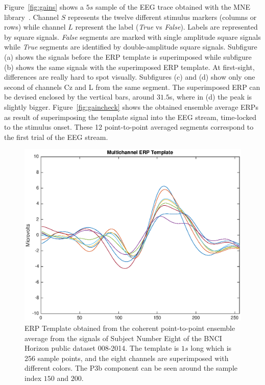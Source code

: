 \documentclass[brainsci,article,submit,moreauthors,pdftex,10pt,a4paper]{mdpi}
\begin{document}
Figure~\ref{fig:gains} shows a $5s$ sample of the EEG trace obtained with the MNE library~\citep{Gramfort2013}.  Channel $S$ represents the twelve different stimulus markers (columns or rows) while channel $L$ represent the label (\textit{True} vs \textit{False}).  Labels are represented by square signals.  \textit{False} segments are marked with single amplitude square signals while \textit{True} segments are identified by double-amplitude square signals.  Subfigure (a) shows the signals before the ERP template is superimposed while subfigure (b) shows the same signals with the superimposed ERP template.  At first-sight, differences are really hard to spot visually.  Subfigures (c) and (d) show only one second of channels Cz and L from the same segment.  The superimposed ERP can be devised enclosed by the vertical bars, around $31.5$s, where in (d) the peak is slightly bigger.  Figure~\ref{fig:gaincheck} shows the obtained ensemble average ERPs as result of superimposing the template signal into the EEG stream, time-locked to the stimulus onset.   These 12 point-to-point averaged segments correspond to the first trial of the EEG stream.


\begin{figure}[H]
\centering
\includegraphics[width=12cm]{images/erptemplate1.eps}
\caption{ERP Template obtained from the coherent point-to-point ensemble average from the signals of Subject Number Eight of the BNCI Horizon public dataset 008-2014. The template is $1s$ long which is 256 sample points, and the eight channels are superimposed with different colors.  The P3b component can be seen around the sample index $150$ and $200$.}
\label{fig:erptemplate1}
\end{figure}
\end{document}

